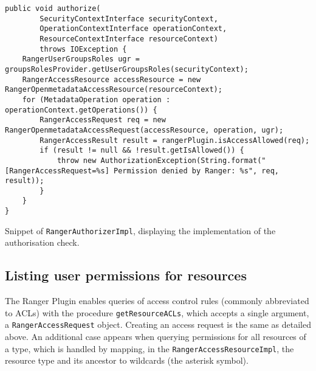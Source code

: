 \begin{listing}

\begin{verbatim}
public void authorize(
        SecurityContextInterface securityContext,
        OperationContextInterface operationContext,
        ResourceContextInterface resourceContext)
        throws IOException {
    RangerUserGroupsRoles ugr = groupsRolesProvider.getUserGroupsRoles(securityContext);
    RangerAccessResource accessResource = new RangerOpenmetadataAccessResource(resourceContext);
    for (MetadataOperation operation : operationContext.getOperations()) {
        RangerAccessRequest req = new RangerOpenmetadataAccessRequest(accessResource, operation, ugr);
        RangerAccessResult result = rangerPlugin.isAccessAllowed(req);
        if (result != null && !result.getIsAllowed()) {
            throw new AuthorizationException(String.format("[RangerAccessRequest=%s] Permission denied by Ranger: %s", req, result));
        }
    }
}
\end{verbatim}

\caption{Snippet of \texttt{RangerAuthorizerImpl}, displaying the implementation of the authorisation check.}
\label{listing:ranger_authorizer_impl_authorize}
    
\end{listing}

\subsection{Listing user permissions for resources}

The Ranger Plugin enables queries of access control rules (commonly abbreviated to ACLs) with the procedure \texttt{getResourceACLs}, which accepts a single argument, a \texttt{RangerAccessRequest} object. Creating an access request is the same as detailed above. An additional case appears when querying permissions for all resources of a type, which is handled by mapping, in the \texttt{RangerAccessResourceImpl}, the resource type and its ancestor to wildcards (the asterisk symbol).

